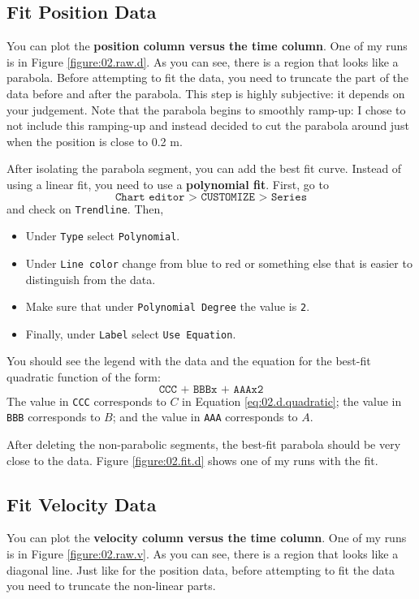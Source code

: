 \subsection{Fit Position Data}
You can plot the \textbf{position column versus the time column}. One of my runs is in Figure \ref{figure:02.raw.d}. As you can see, there is a region that looks like a parabola. Before attempting to fit the data, you need to truncate the part of the data before and after the parabola. This step is highly subjective: it depends on your judgement. Note that the parabola begins to smoothly ramp-up: I chose to not include this ramping-up and instead decided to cut the parabola around just when the position is close to 0.2 m.

After isolating the parabola segment, you can add the best fit curve. Instead of using a linear fit, you need to use a \textbf{polynomial fit}. First, go to
\begin{equation}
    \texttt{Chart editor > CUSTOMIZE > Series}
\end{equation}
and check on \texttt{Trendline}. Then,
\begin{itemize}
    \item Under \texttt{Type} select \texttt{Polynomial}.
    \item Under \texttt{Line color} change from blue to red or something else that is easier to distinguish from the data.
    \item Make sure that under \texttt{Polynomial Degree} the value is \texttt{2}.
    \item Finally, under \texttt{Label} select \texttt{Use Equation}.
\end{itemize}
You should see the legend with the data and the equation for the best-fit quadratic function of the form:
\begin{equation}
    \texttt{CCC + BBBx + AAAx\^{}2}
\end{equation}
The value in \texttt{CCC} corresponds to $C$ in Equation \ref{eq:02.d.quadratic}; the value in \texttt{BBB} corresponds to $B$; and the value in \texttt{AAA} corresponds to $A$.

After deleting the non-parabolic segments, the best-fit parabola should be very close to the data. Figure \ref{figure:02.fit.d} shows one of my runs with the fit.
\subsection{Fit Velocity Data}
You can plot the \textbf{velocity column versus the time column}. One of my runs is in Figure \ref{figure:02.raw.v}. As you can see, there is a region that looks like a diagonal line. Just like for the position data, before attempting to fit the data you need to truncate the non-linear parts.

